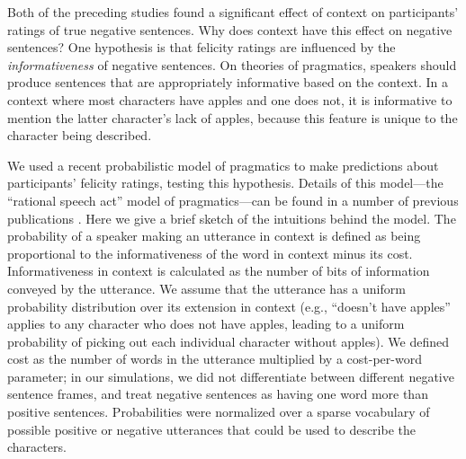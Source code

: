 \documentclass[10pt,letterpaper]{article}
\begin{document}
Both of the preceding studies found a significant effect of context on participants' ratings of true negative sentences.  Why does context have this effect on negative sentences?  One hypothesis is that felicity ratings are influenced by the \emph{informativeness} of negative sentences. On theories of pragmatics, speakers should produce sentences that are appropriately informative based on the context.  In a context where most characters have apples and one does not, it is informative to mention the latter character's lack of apples, because this feature is unique to the character being described.




We used a recent probabilistic model of pragmatics to make predictions about participants' felicity ratings, testing this hypothesis. Details of this model---the ``rational speech act'' model of pragmatics---can be found in a number of previous publications \cite{frank2012,goodman2013,nordmeyer2014}. Here we give a brief sketch of the intuitions behind the model. The probability of a speaker making an utterance in context is defined as being  proportional to the informativeness of the word in context minus its cost.  Informativeness in context is calculated as the number of bits of information conveyed by the utterance.  We assume that the utterance has a uniform probability distribution over its extension in context (e.g., ``doesn't have apples'' applies to any character who does not have apples, leading to a uniform probability of picking out each individual character without apples). We defined cost as the number of words in the utterance multiplied by a cost-per-word parameter; in our simulations, we did not differentiate between different negative sentence frames, and treat negative sentences as having one word more than positive sentences.  Probabilities were normalized over a sparse vocabulary of possible positive or negative utterances that could be used to describe the characters.
\end{document}
